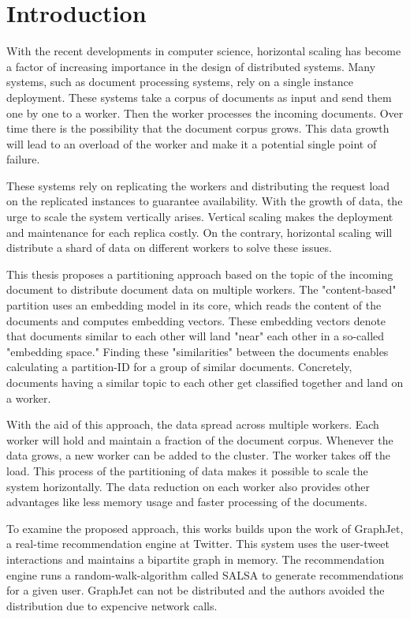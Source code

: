 \chapter{Introduction}

With the recent developments in computer science, horizontal scaling has become a factor of increasing importance in the design of distributed systems. Many systems, such as document processing systems, rely on a single instance deployment. These systems take a corpus of documents as input and send them one by one to a worker. Then the worker processes the incoming documents. Over time there is the possibility that the document corpus grows. This data growth will lead to an overload of the worker and make it a potential single point of failure.


These systems rely on replicating the workers and distributing the request load on the replicated instances to guarantee availability. With the growth of data, the urge to scale the system vertically arises. Vertical scaling makes the deployment and maintenance for each replica costly. On the contrary, horizontal scaling will distribute a shard of data on different workers to solve these issues.


This thesis proposes a partitioning approach based on the topic of the incoming document to distribute document data on multiple workers. The "content-based" partition uses an embedding model in its core, which reads the content of the documents and computes embedding vectors. These embedding vectors denote that documents similar to each other will land "near" each other in a so-called "embedding space." Finding these "similarities" between the documents enables calculating a partition-ID for a group of similar documents. Concretely, documents having a similar topic to each other get classified together and land on a worker.


With the aid of this approach, the data spread across multiple workers. Each worker will hold and maintain a fraction of the document corpus. Whenever the data grows, a new worker can be added to the cluster. The worker takes off the load. This process of the partitioning of data makes it possible to scale the system horizontally. The data reduction on each worker also provides other advantages like less memory usage and faster processing of the documents.


To examine the proposed approach, this works builds upon the work of GraphJet, a real-time recommendation engine at Twitter. This system uses the user-tweet interactions and maintains a bipartite graph in memory. The recommendation engine runs a random-walk-algorithm called SALSA to generate recommendations for a given user. GraphJet can not be distributed and the authors avoided the distribution due to expencive network calls. 


